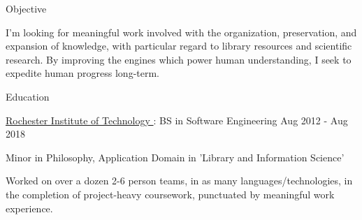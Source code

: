 \documentclass{resume} %
\begin{document}

  \begin{rSection}{Objective}

    I'm looking for meaningful work involved with the organization, preservation, and expansion of knowledge, with particular regard to library resources and scientific research. By improving the engines which power human understanding, I seek to expedite human progress long-term.

  \end{rSection}


  \begin{rSection}{Education}

    \begin{rSubsection}{\underline{Rochester Institute of Technology }: BS in Software Engineering }{ Aug 2012 - Aug 2018 }{}

      \item Minor in Philosophy, Application Domain in 'Library and Information Science'

      \item Worked on over a dozen 2-6 person teams, in as many languages/technologies, in the completion of project-heavy coursework, punctuated by meaningful work experience.

    \end{rSubsection}

  \end{rSection}

\end{document}
